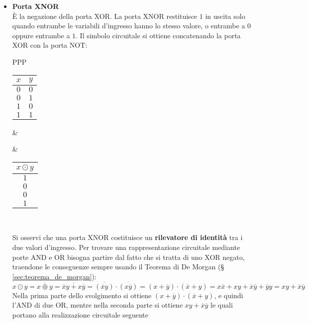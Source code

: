 \documentclass[a4paper]{extarticle}
\begin{document}
\begin{itemize}
    \item \textbf{Porta XNOR}\\
    È la negazione della porta XOR. La porta XNOR restituisce \(1\) in uscita solo quando entrambe le variabili d'ingresso hanno lo stesso valore, o entrambe a \(0\) oppure entrambe a \(1\). Il simbolo circuitale si ottiene concatenando la porta XOR con la porta NOT:

    \vspace{1em}
    \noindent
    \begin{tabularx}{\textwidth}{PPP}
    {
        \begin{tabular}{c|c}
             \(x\) & \(y\)\\
             \hline
             $0$ & $0$\\
             $0$ & $1$\\
             $1$ & $0$\\
             $1$ & $1$
        \end{tabular}
    }
    &
    {
    }
    &
    {
        \begin{tabular}{c}
             \(x \odot y\)\\
             \hline
             $1$\\
             $0$\\
             $0$\\
             $1$
        \end{tabular}
    }\\
    \end{tabularx}
    \vspace{1em}

    \noindent
    Si osservi che una porta XNOR costituisce un \textbf{rilevatore di identità} tra i due valori d'ingresso. Per trovare una rappresentazione circuitale mediante porte AND e OR bisogna partire dal fatto che si tratta di uno XOR negato, traendone le conseguenze sempre usando il Teorema di De Morgan (§ \ref{sec:teorema_de_morgan}):
    \[x \odot y = \overline{x \oplus y} = \overline{\overline{x}y + x \overline{y}} = \overline{(\overline{x}y)} \cdot \overline{(x\overline{y})} = (x + \overline{y}) \cdot (\overline{x} + y) = x\overline{x} + xy + \overline{x}\overline{y} + \overline{y}y = xy + \overline{x}\overline{y}\]
    Nella prima parte dello svolgimento si ottiene \((x + \overline{y}) \cdot (\overline{x} + y)\), e quindi l’AND di due OR, mentre nella seconda parte si ottiene \(xy + \overline{x} \overline{y}\) le quali portano alla realizzazione circuitale seguente


\end{itemize}
\end{document}
